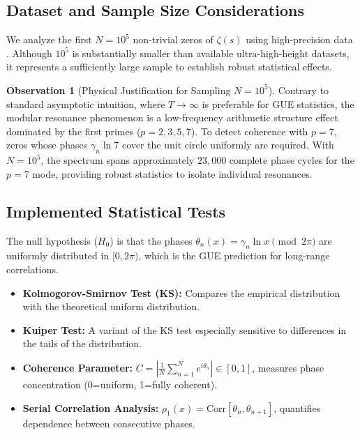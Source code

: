 \documentclass[12pt, a4paper]{article}
\theoremstyle{plain}
\theoremstyle{definition}
\newtheorem{observacion}[teorema]{Observation}
\theoremstyle{remark}
\begin{document}
\subsection{Dataset and Sample Size Considerations}
\label{subsec:dataset}

We analyze the first $N=10^5$ non-trivial zeros of $\zeta(s)$ using high-precision data \cite{gourdon2004, odlyzko2001}. Although $10^5$ is substantially smaller than available ultra-high-height datasets, it represents a sufficiently large sample to establish robust statistical effects.

\begin{observacion}[Physical Justification for Sampling $N=10^5$]
Contrary to standard asymptotic intuition, where $T \to \infty$ is preferable for GUE statistics, the modular resonance phenomenon is a low-frequency arithmetic structure effect dominated by the first primes ($p=2, 3, 5, 7$). To detect coherence with $p=7$, zeros whose phases $\gamma_n \ln 7$ cover the unit circle uniformly are required. With $N=10^5$, the spectrum spans approximately $23,000$ complete phase cycles for the $p=7$ mode, providing robust statistics to isolate individual resonances.
\end{observacion}

\subsection{Implemented Statistical Tests}
\label{subsec:tests_estadisticos}

The null hypothesis ($H_0$) is that the phases $\theta_n(x) = \gamma_n \ln x \pmod{2\pi}$ are uniformly distributed in $[0, 2\pi)$, which is the GUE prediction for long-range correlations.

\begin{itemize}
    \item \textbf{Kolmogorov-Smirnov Test (KS):} Compares the empirical distribution with the theoretical uniform distribution.
    \item \textbf{Kuiper Test:} A variant of the KS test especially sensitive to differences in the tails of the distribution.
    \item \textbf{Coherence Parameter:} $C = \left| \frac{1}{N} \sum_{n=1}^N e^{i\theta_n} \right| \in [0,1]$, measures phase concentration (0=uniform, 1=fully coherent).
    \item \textbf{Serial Correlation Analysis:} $\rho_1(x) = \text{Corr}[\theta_n, \theta_{n+1}]$, quantifies dependence between consecutive phases.
\end{itemize}
\end{document}
